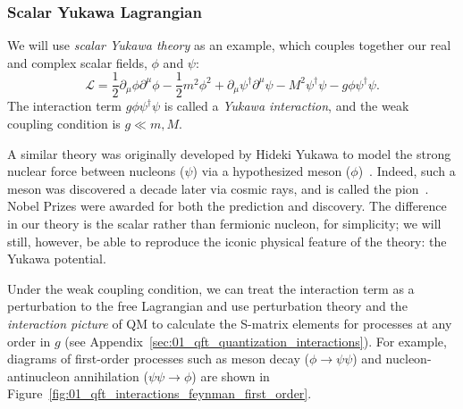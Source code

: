 
\subsubsection{Scalar Yukawa Lagrangian}

We will use \textit{scalar Yukawa theory} as an example, which couples together our real and complex scalar fields, $\phi$ and $\psi$:
\begin{equation}
	\label{eq:01_qft_interactions_yukawa}
	\mathcal L = \frac{1}{2}\partial_\mu\phi\partial^\mu\phi - \frac{1}{2}m^2\phi^2 + \partial_\mu\psi^\dagger\partial^\mu\psi - M^2\psi^\dagger\psi - g\phi\psi^\dagger\psi.
\end{equation}
The interaction term $g\phi\psi^\dagger\psi$ is called a \textit{Yukawa interaction}, and the weak coupling condition is $g \ll m, M$.

A similar theory was originally developed by Hideki Yukawa to model the strong nuclear force between nucleons ($\psi$) via a hypothesized meson ($\phi$)~\cite{Yukawa:1935xg}. 
Indeed, such a meson was discovered a decade later via cosmic rays, and is called the pion~\cite{Lattes:1947mw}.
Nobel Prizes were awarded for both the prediction and discovery.
The difference in our theory is the scalar rather than fermionic nucleon, for simplicity; we will still, however, be able to reproduce the iconic physical feature of the theory: the Yukawa potential.

Under the weak coupling condition, we can treat the interaction term as a perturbation to the free Lagrangian and use perturbation theory and the \textit{interaction picture} of QM to calculate the S-matrix elements for processes at any order in $g$ (see Appendix~\ref{sec:01_qft_quantization_interactions}).
For example, diagrams of first-order processes such as meson decay ($\phi \rightarrow \psi\psi$) and nucleon-antinucleon annihilation ($\psi\psi \rightarrow \phi$) are shown in Figure~\ref{fig:01_qft_interactions_feynman_first_order}.



